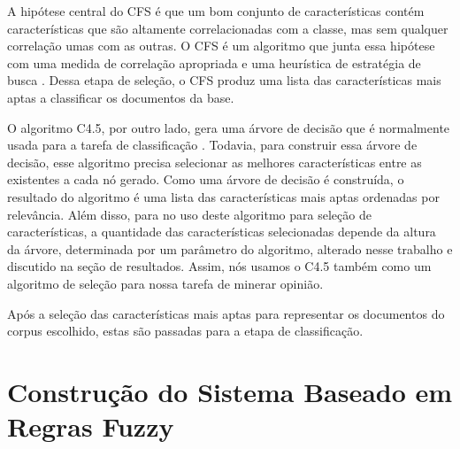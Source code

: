 \documentclass[template.tex]{subfiles}
\begin{document}
A hipótese central do CFS é que um bom conjunto de características contém características que são altamente correlacionadas com a classe, mas sem qualquer correlação umas com as outras. O CFS é um algoritmo que junta essa hipótese com uma medida de correlação apropriada e uma heurística de estratégia de busca \cite{hall1999correlation}. Dessa etapa de seleção, o CFS produz uma lista das características mais aptas a classificar os documentos da base. 


O algoritmo C4.5, por outro lado, gera uma árvore de decisão que é normalmente usada para a tarefa de classificação \cite{quinlan19934}. Todavia, para construir essa árvore de decisão, esse algoritmo precisa selecionar as melhores características entre as existentes a cada nó gerado. Como uma árvore de decisão é construída, o resultado do algoritmo é uma lista das características mais aptas ordenadas por relevância. Além disso, para no uso deste algoritmo para seleção de características, a quantidade das características selecionadas depende da altura da árvore, determinada por um parâmetro do algoritmo, alterado nesse trabalho e discutido na seção de resultados. Assim, nós usamos o C4.5 também como um algoritmo de seleção para nossa tarefa de minerar opinião. 

Após a seleção das características mais aptas para representar os documentos do corpus escolhido, estas são passadas para a etapa de classificação. 

\section{Construção do Sistema Baseado em Regras Fuzzy}

\end{document}
